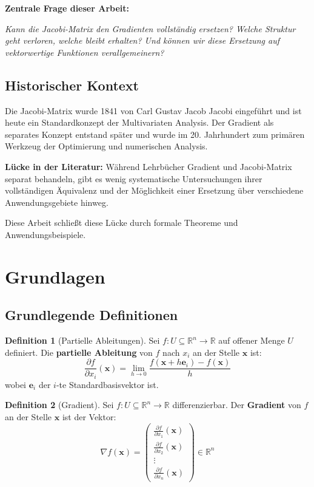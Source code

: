 ﻿\documentclass[a4paper,12pt]{article}
\theoremstyle{definition}
\newtheorem{definition}{Definition}
\begin{document}
\textbf{Zentrale Frage dieser Arbeit:} 

\emph{Kann die Jacobi-Matrix den Gradienten vollständig ersetzen? Welche Struktur geht verloren, welche bleibt erhalten? Und können wir diese Ersetzung auf vektorwertige Funktionen verallgemeinern?}

\subsection{Historischer Kontext}

Die Jacobi-Matrix wurde 1841 von Carl Gustav Jacob Jacobi eingeführt und ist heute ein Standardkonzept der Multivariaten Analysis. Der Gradient als separates Konzept entstand später und wurde im 20. Jahrhundert zum primären Werkzeug der Optimierung und numerischen Analysis.

\textbf{Lücke in der Literatur:} Während Lehrbücher Gradient und Jacobi-Matrix separat behandeln, gibt es wenig systematische Untersuchungen ihrer vollständigen Äquivalenz und der Möglichkeit einer Ersetzung über verschiedene Anwendungsgebiete hinweg.

Diese Arbeit schließt diese Lücke durch formale Theoreme und Anwendungsbeispiele.

\section{Grundlagen}

\subsection{Grundlegende Definitionen}

\begin{definition}[Partielle Ableitungen]
	Sei $f: U \subseteq \mathbb{R}^n \to \mathbb{R}$ auf offener Menge $U$ definiert. Die \textbf{partielle Ableitung} von $f$ nach $x_i$ an der Stelle $\boldsymbol{x}$ ist:
	\[
	\frac{\partial f}{\partial x_i}(\boldsymbol{x}) = \lim_{h \to 0} \frac{f(\boldsymbol{x} + h\boldsymbol{e}_i) - f(\boldsymbol{x})}{h}
	\]
	wobei $\boldsymbol{e}_i$ der $i$-te Standardbasisvektor ist.
\end{definition}

\begin{definition}[Gradient]
	Sei $f: U \subseteq \mathbb{R}^n \to \mathbb{R}$ differenzierbar. Der \textbf{Gradient} von $f$ an der Stelle $\boldsymbol{x}$ ist der Vektor:
	\[
	\nabla f(\boldsymbol{x}) = \begin{pmatrix} 
		\frac{\partial f}{\partial x_1}(\boldsymbol{x}) \\
		\frac{\partial f}{\partial x_2}(\boldsymbol{x}) \\
		\vdots \\
		\frac{\partial f}{\partial x_n}(\boldsymbol{x})
	\end{pmatrix} \in \mathbb{R}^n
	\]
\end{definition}
\end{document}
